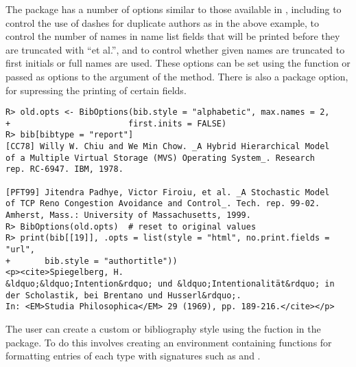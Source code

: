 \documentclass[article]{jss}\usepackage[]{graphicx}\usepackage[]{color}
\makeatletter
\newenvironment{kframe}{%
 \def\at@end@of@kframe{}%
 \ifinner\ifhmode%
  \def\at@end@of@kframe{\end{minipage}}%
  \begin{minipage}{\columnwidth}%
 \fi\fi%
 \def\FrameCommand##1{\hskip\@totalleftmargin \hskip-\fboxsep
 \colorbox{shadecolor}{##1}\hskip-\fboxsep
     \hskip-\linewidth \hskip-\@totalleftmargin \hskip\columnwidth}%
 \MakeFramed {\advance\hsize-\width
   \@totalleftmargin\z@ \linewidth\hsize
   \@setminipage}}%
 {\par\unskip\endMakeFramed%
 \at@end@of@kframe}
\newenvironment{knitrout}{}{} %
\makeatother
\begin{document}
The package has a number of options similar to those available in \Biblatex{}, including  to control the use of dashes for duplicate authors as in the above example,  to control the number of names in name list fields that will be printed before they are truncated with ``et al.'', and  to control whether given names are truncated to first initials or full names are used.  These options can be set using the  function or passed as options to the  argument of the  method. There is also a package option,  for supressing the printing of certain fields.
\begin{knitrout}
\color{fgcolor}\begin{kframe}
\begin{verbatim}
R> old.opts <- BibOptions(bib.style = "alphabetic", max.names = 2, 
+                        first.inits = FALSE)
R> bib[bibtype = "report"]
[CC78] Willy W. Chiu and We Min Chow. _A Hybrid Hierarchical Model
of a Multiple Virtual Storage (MVS) Operating System_. Research
rep. RC-6947. IBM, 1978.

[PFT99] Jitendra Padhye, Victor Firoiu, et al. _A Stochastic Model
of TCP Reno Congestion Avoidance and Control_. Tech. rep. 99-02.
Amherst, Mass.: University of Massachusetts, 1999.
R> BibOptions(old.opts)  # reset to original values
R> print(bib[[19]], .opts = list(style = "html", no.print.fields = "url", 
+       bib.style = "authortitle"))
<p><cite>Spiegelberg, H.
&ldquo;&ldquo;Intention&rdquo; und &ldquo;Intentionalität&rdquo; in
der Scholastik, bei Brentano und Husserl&rdquo;.
In: <EM>Studia Philosophica</EM> 29 (1969), pp. 189-216.</cite></p>
\end{verbatim}
\end{kframe}
\end{knitrout}


The user can create a custom \Biblatex{} or \Bibtex{} bibliography style using the  fuction in the  package.  To do this involves creating an environment containing functions for formatting entries of each type with signatures such as  and .
\end{document}
